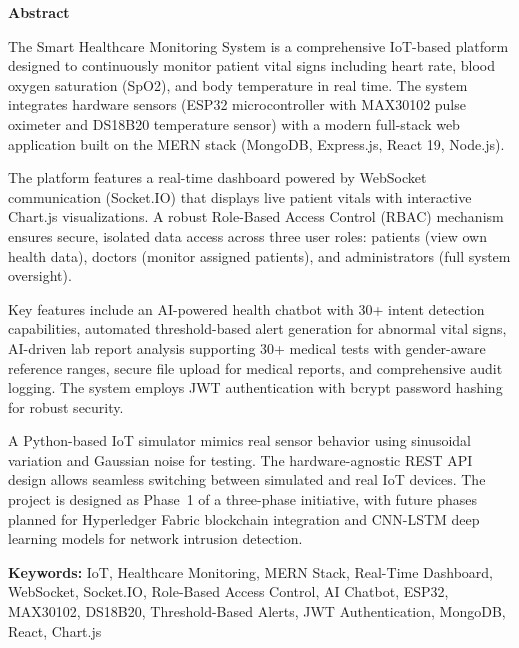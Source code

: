 \newpage
\thispagestyle{empty}
\begin{center}
{\LARGE\bfseries Abstract\\[1cm]}
\end{center}

The Smart Healthcare Monitoring System is a comprehensive IoT-based platform designed to continuously monitor patient vital signs including heart rate, blood oxygen saturation (SpO2), and body temperature in real time. The system integrates hardware sensors (ESP32 microcontroller with MAX30102 pulse oximeter and DS18B20 temperature sensor) with a modern full-stack web application built on the MERN stack (MongoDB, Express.js, React 19, Node.js).

\vspace{0.4cm}
The platform features a real-time dashboard powered by WebSocket communication (Socket.IO) that displays live patient vitals with interactive Chart.js visualizations. A robust Role-Based Access Control (RBAC) mechanism ensures secure, isolated data access across three user roles: patients (view own health data), doctors (monitor assigned patients), and administrators (full system oversight).

\vspace{0.4cm}
Key features include an AI-powered health chatbot with 30+ intent detection capabilities, automated threshold-based alert generation for abnormal vital signs, AI-driven lab report analysis supporting 30+ medical tests with gender-aware reference ranges, secure file upload for medical reports, and comprehensive audit logging. The system employs JWT authentication with bcrypt password hashing for robust security.

\vspace{0.4cm}
A Python-based IoT simulator mimics real sensor behavior using sinusoidal variation and Gaussian noise for testing. The hardware-agnostic REST API design allows seamless switching between simulated and real IoT devices. The project is designed as Phase~1 of a three-phase initiative, with future phases planned for Hyperledger Fabric blockchain integration and CNN-LSTM deep learning models for network intrusion detection.

\vspace{0.8cm}
\noindent\textbf{Keywords:} IoT, Healthcare Monitoring, MERN Stack, Real-Time Dashboard, WebSocket, Socket.IO, Role-Based Access Control, AI Chatbot, ESP32, MAX30102, DS18B20, Threshold-Based Alerts, JWT Authentication, MongoDB, React, Chart.js
